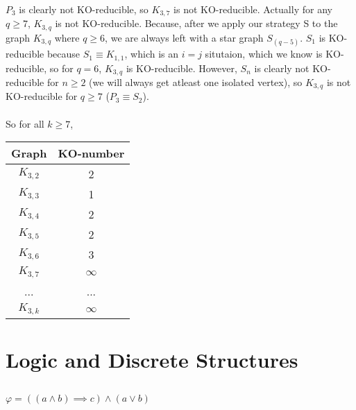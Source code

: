 \documentclass[]{article}
\begin{document}
$P_{3}$ is clearly not KO-reducible, so $K_{3,7}$ is not KO-reducible. Actually for any $q \geq 7$, $K_{3,q}$ is not KO-reducible. Because, after we apply our strategy S to the graph $K_{3,q}$ where $q \geq 6$, we are always left with a star graph $S_{(q-5)}$. $S_{1}$ is KO-reducible because $S_{1} \equiv K_{1,1}$, which is an $i =j$ situtaion, which we know is KO-reducible, so for $q=6$, $K_{3,q}$ is KO-reducible. However, $S_{n}$ is clearly not KO-reducible for $n \geq 2$ (we will always get atleast one isolated vertex), so $K_{3,q}$ is not KO-reducible for $q \geq 7$ ($P_{3} \equiv S_{2}$).
\\
\\
So for all $k \geq 7$,
\begin{center}
\begin{tabular}{|c|c|}
	\hline
	Graph & KO-number	\\
	\hline
	$K_{3,2}$ & 2	\\
	\hline
	$K_{3,3}$ & 1	\\
	\hline
	$K_{3,4}$ & 2	\\
	\hline
	$K_{3,5}$ & 2	\\
	\hline
	$K_{3,6}$ & 3	\\
	\hline
	$K_{3,7}$ & $\infty$	\\
	\hline
	... & ...	\\
	\hline
	$K_{3,k}$ & $\infty$	\\
	\hline
\end{tabular}  
\end{center}
\newpage
\section{Logic and Discrete Structures}
\subsection{}
$\varphi = ((a \wedge b)\implies c) \wedge(a \vee b)$
\end{document}
